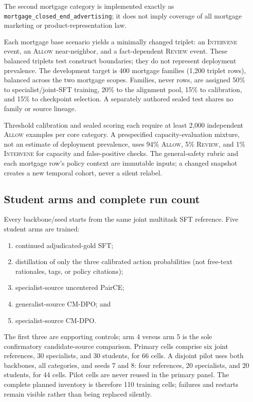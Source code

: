 \documentclass[10pt]{article}
\newcommand{\method}{\textsc{CM-DPO}}
\newcommand{\allow}{\textsc{Allow}}
\newcommand{\review}{\textsc{Review}}
\newcommand{\intervene}{\textsc{Intervene}}
\begin{document}
The second mortgage category is implemented exactly as
\texttt{mortgage\_closed\_end\_advertising}; it does not imply coverage of all
mortgage marketing or product-representation law.

Each mortgage base scenario yields a minimally changed triplet: an
\intervene{} event, an \allow{} near-neighbor, and a fact-dependent \review{}
event. These balanced triplets test construct boundaries; they do not represent
deployment prevalence. The development target is 400 mortgage families (1,200
triplet rows), balanced across the two mortgage scopes. Families, never rows,
are assigned 50\% to specialist/joint-SFT training, 20\% to the alignment pool,
15\% to calibration, and 15\% to checkpoint selection. A separately authored
sealed test shares no family or source lineage.

Threshold calibration and sealed scoring each require at least 2,000 independent
\allow{} examples per core category. A prespecified capacity-evaluation mixture,
not an estimate of deployment prevalence, uses 94\% \allow, 5\% \review, and
1\% \intervene{} for capacity and false-positive checks. The general-safety
rubric and each mortgage row's policy context are
immutable inputs; a changed snapshot creates a new temporal cohort, never a
silent relabel.

\subsection{Student arms and complete run count}

Every backbone/seed starts from the same joint multitask SFT reference. Five
student arms are trained:
\begin{enumerate}
  \item continued adjudicated-gold SFT;
  \item distillation of only the three calibrated action probabilities (not
  free-text rationales, tags, or policy citations);
  \item specialist-source uncentered PairCE;
  \item generalist-source \method; and
  \item specialist-source \method.
\end{enumerate}
The first three are supporting controls; arm 4 versus arm 5 is the sole
confirmatory candidate-source comparison. Primary cells comprise six joint
references, 30 specialists, and 30 students, for 66 cells. A disjoint pilot uses
both backbones, all categories, and seeds 7 and 8: four references, 20
specialists, and 20 students, for 44 cells. Pilot cells are never reused in the
primary panel. The complete planned inventory is therefore 110 training cells;
failures and restarts remain visible rather than being replaced silently.
\end{document}
